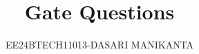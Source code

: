 \documentclass[journal]{IEEEtran}
\begin{document}

\vspace{3cm}

\title{Gate Questions}
\author{EE24BTECH11013-DASARI MANIKANTA
}
 \maketitle
{\let\newpage\relax\maketitle}

\renewcommand{\thefigure}{\theenumi}
\renewcommand{\thetable}{\theenumi}
\setlength{\intextsep}{10pt} %


\renewcommand{\thetable}{\theenumi}
\end{document}
